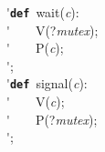 \'\>\texttt{\textbf{def}}~wait(\textit{c}):\\

\'\>~~~~V(?\textit{mutex});\\

\'\>~~~~P(\textit{c});\\

\'\>;\\

\'\>\texttt{\textbf{def}}~signal(\textit{c}):\\

\'\>~~~~V(\textit{c});\\

\'\>~~~~P(?\textit{mutex});\\

\'\>;